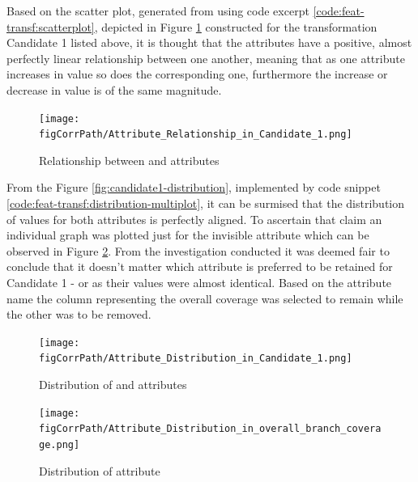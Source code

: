 Based on the scatter plot, generated from using code excerpt \ref{code:feat-transf:scatterplot}, depicted in Figure \ref{fig:candidate1-scatterplot} constructed for the transformation Candidate 1 listed above, it is thought that the attributes have a positive, almost perfectly linear relationship between one another, meaning that as one attribute increases in value so does the corresponding one, furthermore the increase or decrease in value is of the same magnitude.
\begin{figure}[h!]
    \centering
    \texttt{[image: \\figCorrPath/Attribute\_Relationship\_in\_Candidate\_1.png]}
    \caption{Relationship between \overallBranchCoverage{} and \branchCoverage{} attributes}
    \label{fig:candidate1-scatterplot}
\end{figure}

From the Figure \ref{fig:candidate1-distribution}, implemented by code snippet \ref{code:feat-transf:distribution-multiplot}, it can be surmised that the distribution of values for both attributes is perfectly aligned. To ascertain that claim an individual graph was plotted just for the invisible attribute \overallBranchCoverage{} which can be observed in Figure \ref{fig:candidate1-attrib2-distribution}.
From the investigation conducted it was deemed fair to conclude that it doesn't matter which attribute is preferred to be retained for Candidate 1 - \overallBranchCoverage{} or \branchCoverage{} as their values were almost identical. Based on the attribute name the column representing the overall coverage was selected to remain while the other was to be removed.

\begin{landscape}
\begin{figure}
\centering
\begin{minipage}{0.89\textwidth}
  \centering
  \texttt{[image: \\figCorrPath/Attribute\_Distribution\_in\_Candidate\_1.png]}
    \caption{Distribution of \overallBranchCoverage{} and \branchCoverage{} attributes}
    \label{fig:candidate1-distribution}
\end{minipage}%
\begin{minipage}{0.89\textwidth}
   \texttt{[image: \\figCorrPath/Attribute\_Distribution\_in\_overall\_branch\_coverage.png]}
    \caption{Distribution of \overallBranchCoverage{} attribute}
    \label{fig:candidate1-attrib2-distribution}
\end{minipage}
\end{figure}
\end{landscape}
\FloatBarrier

